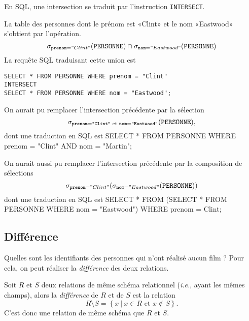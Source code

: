 En SQL, une intersection se traduit par l'instruction \texttt{INTERSECT}.
\begin{exemple}
La table des personnes dont le prénom est «Clint» et le nom «Eastwood» s'obtient par l'opération.
\begin{equation*}
  \sigma_{\mathtt{prenom}="Clint"}(\mathtt{PERSONNE})\cap \sigma_{\mathtt{nom}="Eastwood"}(\mathtt{PERSONNE})
\end{equation*}
La requête SQL traduisant cette union est 
\begin{verbatim}
SELECT * FROM PERSONNE WHERE prenom = "Clint"
INTERSECT
SELECT * FROM PERSONNE WHERE nom = "Eastwood";
\end{verbatim}
\end{exemple}

\begin{rem}
  On aurait pu remplacer l'intersection précédente par la sélection 
  \begin{equation*}
    \sigma_{\mathtt{prenom}=\texttt{"Clint"}\textrm{ et }\mathtt{nom}=\texttt{"Eastwood"}}(\mathtt{PERSONNE}),
  \end{equation*}
  dont une traduction en SQL est 
SELECT * 
FROM PERSONNE
WHERE prenom = "Clint"
      AND 
      nom = "Martin";
\end{rem}

\begin{rem}
  On aurait aussi pu remplacer l'intersection précédente par la composition de sélections
  \begin{equation*}
    \sigma_{\mathtt{prenom}="Clint"}(\sigma_{\mathtt{nom}="Eastwood"}(\mathtt{PERSONNE}))
  \end{equation*}
  dont une traduction en SQL est 
SELECT * 
FROM (SELECT *
      FROM PERSONNE
      WHERE nom = "Eastwood")
WHERE prenom = Clint;
\end{rem}

\subsection{Différence}
Quelles sont les identifiants des personnes qui n'ont réalisé aucun film ? Pour cela, on peut réaliser  la \emph{différence} des deux relations.

\begin{defi}[Différence]
  Soit $R$ et $S$ deux relations de même schéma relationnel (\emph{i.e.}, ayant les mêmes champs), alors la \emph{différence} de $R$ et de $S$ est la relation 
  \begin{equation*}
    R\setminus S = \left\{x ~|~ x\in R\textrm{ et }x\notin S\right\}.
  \end{equation*}
  C'est donc une relation de même schéma que $R$ et $S$.
\end{defi}

